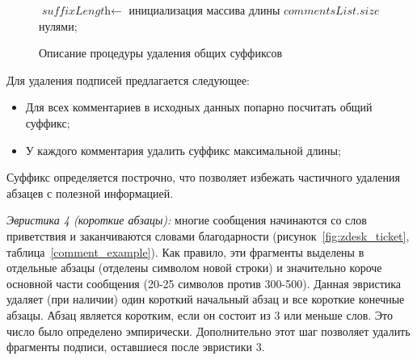 \begin{figure}[tph!]
\begin{algorithm}[H]
		\SetAlgoLined
		$\textit{suffixLength} \leftarrow$ инициализация массива длины $commentsList.size$ нулями;\\
		
\end{algorithm}
	\caption{Описание процедуры удаления общих суффиксов}
	\label{algo1}
\end{figure}
\vskip 2mm
Для удаления подписей предлагается следующее:

 \begin{itemize}
\item Для всех комментариев в исходных данных попарно посчитать общий суффикс;
\item У каждого комментария удалить суффикс максимальной длины;
\end{itemize}

Суффикс определяется построчно, что позволяет избежать частичного удаления абзацев с полезной информацией.

\textit{Эвристика 4 (короткие абзацы):} многие сообщения начинаются со слов приветствия и заканчиваются словами благодарности (рисунок~\ref{fig:zdesk_ticket}, таблица~\ref{comment_example}). Как правило, эти фрагменты выделены в отдельные абзацы (отделены символом новой строки) и значительно короче основной части сообщения (20-25 символов против 300-500). Данная эвристика удаляет (при наличии) один короткий начальный абзац и все короткие конечные абзацы. Абзац является коротким, если он состоит из 3 или меньше слов. Это число было определено эмпирически. Дополнительно этот шаг позволяет удалить фрагменты подписи, оставшиеся после эвристики 3.

